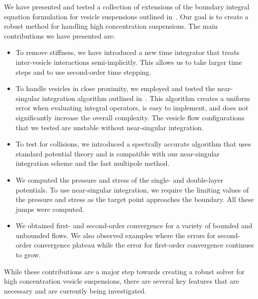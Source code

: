 We have presented and tested a collection of extensions of the boundary
integral equation formulation for vesicle suspensions outlined
in~\cite{rah:vee:bir}.  Our goal is to create a robust method for
handling high concentration suspensions.  The main contributions we have
presented are:
\begin{itemize}

\item To remove stiffness, we have introduced a new time integrator that
treats inter-vesicle interactions semi-implicitly.  This allows us to
take larger time steps and to use second-order time stepping.  

\item To handle vesicles in close proximity, we employed and tested the
near-singular integration algorithm outlined
in~\cite{ying-biros-zorin06}.  This algorithm creates a uniform error
when evaluating integral operators, is easy to implement, and does not
significantly increase the overall complexity.  The vesicle flow
configurations that we tested are unstable without near-singular
integration.

\item To test for collisions, we introduced a spectrally accurate
algorithm that uses standard potential theory and is compatible with
our near-singular integration scheme and the fast multipole method.

\item We computed the pressure and stress of the single- and
double-layer potentials.  To use near-singular integration, we require
the limiting values of the pressure and stress as the target point
approaches the boundary.  All these jumps were computed.

\item We obtained first- and second-order convergence for a variety of
bounded and unbounded flows.  We also observed examples where the errors
for second-order convergence plateau while the error for first-order
convergence continues to grow.
\end{itemize}

While these contributions are a major step towards creating a robust
solver for high concentration vesicle suspensions, there are several key
features that are necessary and are currently being investigated.

